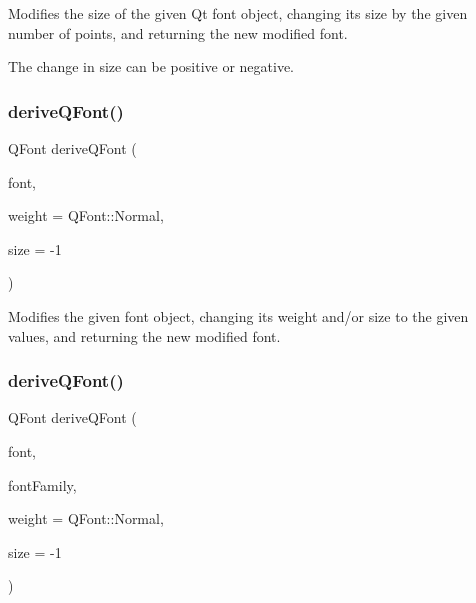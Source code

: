 Modifies the size of the given Qt font object, changing its size by the given number of points, and returning the new modified font. 

The change in size can be positive or negative. \mbox{\label{classGFont_ac36fbf8f4ebf4558559f98d54277529f}} 
\subsubsection{\texorpdfstring{derive\+Q\+Font()}{deriveQFont()}\hspace{0.1cm}{\footnotesize\ttfamily [1/4]}}
{\footnotesize\ttfamily Q\+Font derive\+Q\+Font (\begin{DoxyParamCaption}\item[{const Q\+Font \&}]{font,  }\item[{Q\+Font\+::\+Weight}]{weight = {\ttfamily QFont\+:\+:Normal},  }\item[{int}]{size = {\ttfamily -\/1} }\end{DoxyParamCaption})\hspace{0.3cm}{\ttfamily [static]}}



Modifies the given font object, changing its weight and/or size to the given values, and returning the new modified font. 

\mbox{\label{classGFont_aa0a91decdb8d9bec6e875ebac9d81c97}} 
\subsubsection{\texorpdfstring{derive\+Q\+Font()}{deriveQFont()}\hspace{0.1cm}{\footnotesize\ttfamily [2/4]}}
{\footnotesize\ttfamily Q\+Font derive\+Q\+Font (\begin{DoxyParamCaption}\item[{const Q\+Font \&}]{font,  }\item[{const std\+::string \&}]{font\+Family,  }\item[{Q\+Font\+::\+Weight}]{weight = {\ttfamily QFont\+:\+:Normal},  }\item[{int}]{size = {\ttfamily -\/1} }\end{DoxyParamCaption})\hspace{0.3cm}{\ttfamily [static]}}



